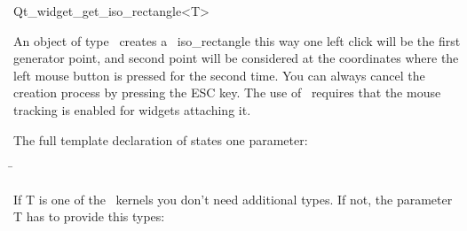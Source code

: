 
\begin{ccRefClass}{Qt_widget_get_iso_rectangle<T>}

\ccDefinition
An object of type \ccRefName\ creates a \cgal\ iso\_rectangle this way
one left click will be the first generator point, and second point
will be considered at the coordinates where the left mouse button is
pressed for the second time.
You can always cancel the creation process by pressing the ESC key.
The use of \ccRefName\ requires that the mouse tracking is
enabled for widgets attaching it.


\ccParameters
The full template declaration of  states one parameter:
\begin{tabbing}
 \=\\
\end{tabbing}

If T is one of the \cgal\ kernels you don't need additional types. If
not, the parameter T has to provide this types:

\ccTypes
{}

\ccInheritsFrom
{}

\ccGlue

\ccCreation
{}


\end{ccRefClass}

